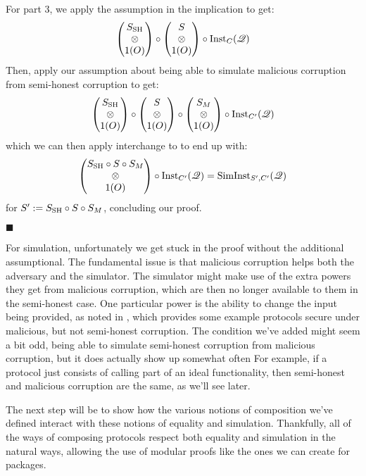 \begin{theorem}
  For part 3, we apply the assumption in the implication to get:
  $$
  \begin{pmatrix}
    S_{\text{SH}}\cr
    \otimes\cr
    1(O)
  \end{pmatrix}
  \circ
  \begin{pmatrix}
    S\cr
    \otimes\cr
    1(O)
  \end{pmatrix}
  \circ \text{Inst}_{C}(\mathscr{Q})
  $$
  Then, apply our assumption about being able to simulate malicious corruption
  from semi-honest corruption to get:
  $$
  \begin{pmatrix}
    S_{\text{SH}}\cr
    \otimes\cr
    1(O)
  \end{pmatrix}
  \circ
  \begin{pmatrix}
    S\cr
    \otimes\cr
    1(O)
  \end{pmatrix}
  \circ
  \begin{pmatrix}
    S_M\cr
    \otimes\cr
    1(O)
  \end{pmatrix}
  \circ \text{Inst}_{C'}(\mathscr{Q})
  $$
  which we can then apply interchange to to end up with:
  $$
  \begin{pmatrix}
    S_{\text{SH}} \circ S \circ S_M\cr
    \otimes\cr
    1(O)
  \end{pmatrix}
  \circ \text{Inst}_{C'}(\mathscr{Q})
  = \text{SimInst}_{S', C'}(\mathscr{Q})
  $$
  for $S' := S_{\text{SH}} \circ S \circ S_M$, concluding our proof.

  $\blacksquare$
\end{theorem}

For simulation, unfortunately we get stuck in the proof without the additional
assumptional.
The fundamental issue is that malicious corruption helps both
the adversary and the simulator.
The simulator might make use of the extra powers they get
from malicious corruption, which are then no longer available
to them in the semi-honest case.
One particular power is the ability to change the input being
provided, as noted in
\cite{EPRINT:HazLin10a}, which provides
some example protocols secure under malicious, but not semi-honest corruption.
The condition we've added might seem a bit odd, being able to simulate
semi-honest corruption from malicious corruption,
but it does actually show up somewhat often
For example, if a protocol just consists of calling part of an ideal
functionality, then semi-honest and malicious corruption
are the same, as we'll see later.

The next step will be to show how the various notions of composition
we've defined interact with these notions of equality and simulation.
Thankfully, all of the ways of composing protocols
respect both equality and simulation in the natural ways,
allowing the use of modular proofs like the ones we can create
for packages.

